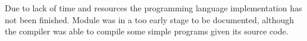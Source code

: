 \documentclass[../documentation.tex]{subfiles}
\begin{document}
\color{red} Due to lack of time and resources the
programming language implementation has not been finished.
Module was in a too early stage to be documented,
although the compiler was able to compile some simple
programs given its source code.
\end{document}
